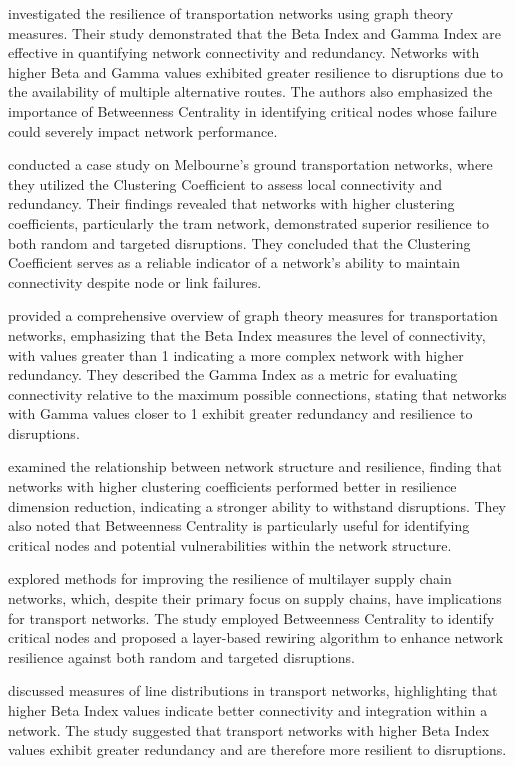  \cite{wu2018} investigated the resilience of transportation networks using graph theory measures. Their study demonstrated that the Beta Index and Gamma Index are effective in quantifying network connectivity and redundancy. Networks with higher Beta and Gamma values exhibited greater resilience to disruptions due to the availability of multiple alternative routes. The authors also emphasized the importance of Betweenness Centrality in identifying critical nodes whose failure could severely impact network performance.

\cite{leu2010}conducted a case study on Melbourne's ground transportation networks, where they utilized the Clustering Coefficient to assess local connectivity and redundancy. Their findings revealed that networks with higher clustering coefficients, particularly the tram network, demonstrated superior resilience to both random and targeted disruptions. They concluded that the Clustering Coefficient serves as a reliable indicator of a network's ability to maintain connectivity despite node or link failures.

\cite{ducruet2024} provided a comprehensive overview of graph theory measures for transportation networks, emphasizing that the Beta Index measures the level of connectivity, with values greater than 1 indicating a more complex network with higher redundancy. They described the Gamma Index as a metric for evaluating connectivity relative to the maximum possible connections, stating that networks with Gamma values closer to 1 exhibit greater redundancy and resilience to disruptions.

\cite{xu2024} examined the relationship between network structure and resilience, finding that networks with higher clustering coefficients performed better in resilience dimension reduction, indicating a stronger ability to withstand disruptions. They also noted that Betweenness Centrality is particularly useful for identifying critical nodes and potential vulnerabilities within the network structure.

\cite{hui2020} explored methods for improving the resilience of multilayer supply chain networks, which, despite their primary focus on supply chains, have implications for transport networks. The study employed Betweenness Centrality to identify critical nodes and proposed a layer-based rewiring algorithm to enhance network resilience against both random and targeted disruptions.

\cite{ngogo2017} discussed measures of line distributions in transport networks, highlighting that higher Beta Index values indicate better connectivity and integration within a network. The study suggested that transport networks with higher Beta Index values exhibit greater redundancy and are therefore more resilient to disruptions.


